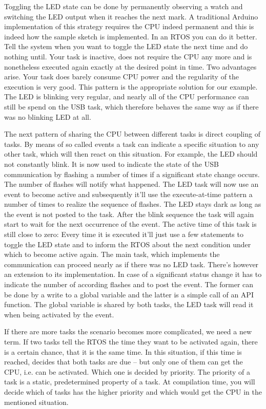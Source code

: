 Toggling the LED state can be done by permanently observing a watch and
switching the LED output when it reaches the next mark. A traditional
Arduino implementation of this strategy requires the CPU indeed permanent
and this is indeed how the sample sketch  is implemented. In
an RTOS you can do it better. Tell the system when you want to toggle the
LED state the next time and do nothing until. Your task is inactive, does
not require the CPU any more and is nonetheless executed again exactly at
the desired point in time. Two advantages arise. Your task does barely
consume CPU power and the regularity of the execution is very good. This
pattern is the appropriate solution for our example. The LED is blinking
very regular, and nearly all of the CPU performance can still be spend on
the USB task, which therefore behaves the same way as if there was no
blinking LED at all.

The next pattern of sharing the CPU between different tasks is direct
coupling of tasks. By means of so called events a task can indicate a
specific situation to any other task, which will then react on this
situation. For example, the LED should not constantly blink. It is now
used to indicate the state of the USB communication by flashing a number
of times if a significant state change occurs. The number of flashes will
notify what happened. The LED task will now use an event to become active
and subsequently it'll use the execute-at-time pattern a number of times
to realize the sequence of flashes. The LED stays dark as long as the
event is not posted to the task. After the blink sequence the task will
again start to wait for the next occurrence of the event. The active time of
this task is still close to zero: Every time it is executed it'll just use
a few statements to toggle the LED state and to inform the RTOS about the
next condition under which to become active again. The main task, which
implements the communication can proceed nearly as if there was no LED
task. There's however an extension to its implementation. In case of a
significant status change it has to indicate the number of according
flashes and to post the event. The former can be done by a write to a
global variable and the latter is a simple call of an \rtos{} API
function. The global variable is shared by both tasks, the LED task will
read it when being activated by the event.

If there are more tasks the scenario becomes more complicated, we need a
new term. If two tasks tell the RTOS the time they want to be activated
again, there is a certain chance, that it is the same time. In this
situation, if this time is reached, \rtos{} decides that both tasks are
due -- but only one of them can get the CPU, i.e. can be activated. Which
one is decided by priority. The priority of a task is a static,
predetermined property of a task. At compilation time, you will decide
which of tasks has the higher priority and which would get the CPU in the
mentioned situation. 

